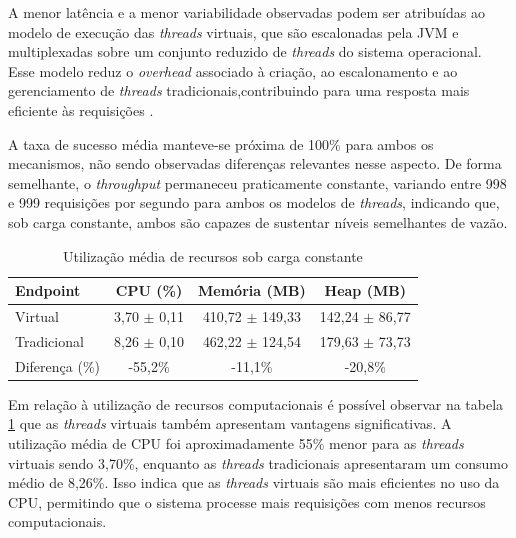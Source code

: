 \documentclass[12pt, openright, oneside, a4paper, english,	french,	spanish, brazil	]{abntex2}
\begin{document}
A menor latência e a menor variabilidade observadas podem ser atribuídas ao modelo de execução das \textit{threads} virtuais, que são escalonadas pela JVM e multiplexadas sobre um conjunto reduzido de \textit{threads} do sistema operacional. Esse modelo reduz o \textit{overhead} associado à criação, ao escalonamento e ao gerenciamento de \textit{threads} tradicionais,contribuindo para uma resposta mais eficiente às requisições \cite{JEP444}.

A taxa de sucesso média manteve-se próxima de 100\% para ambos os mecanismos, não sendo observadas diferenças relevantes nesse aspecto. De forma semelhante, o \textit{throughput} permaneceu praticamente constante, variando entre 998 e 999 requisições por segundo para ambos os modelos de \textit{threads}, indicando que, sob carga constante, ambos são capazes de sustentar níveis semelhantes de vazão.

    \begin{table}[H]
        \centering
        \caption{\footnotesize Utilização média de recursos sob carga constante}
        \label{tab:recursos_carga_constante}
        \footnotesize
        \renewcommand{\arraystretch}{1.15}
        \setlength{\tabcolsep}{6pt}
        \begin{tabular}{lccc}
            \toprule
            \textbf{Endpoint} & \textbf{CPU (\%)} & \textbf{Memória (MB)} & \textbf{Heap (MB)} \\
            \midrule
            Virtual       & 3,70 $\pm$ 0,11  & 410,72 $\pm$ 149,33 & 142,24 $\pm$ 86,77 \\
            Tradicional   & 8,26 $\pm$ 0,10  & 462,22 $\pm$ 124,54 & 179,63 $\pm$ 73,73 \\
            Diferença (\%)& -55,2\%           & -11,1\%              & -20,8\% \\
            \bottomrule
        \end{tabular}
    \end{table}


Em relação à utilização de recursos computacionais é possível observar na tabela \ref{tab:recursos_carga_constante} que as \textit{threads} virtuais também apresentam vantagens significativas. A utilização média de CPU foi aproximadamente 55\% menor para as \textit{threads} virtuais sendo 3,70\%, enquanto as \textit{threads} tradicionais apresentaram um consumo médio de 8,26\%. Isso indica que as \textit{threads} virtuais são mais eficientes no uso da CPU, permitindo que o sistema processe mais requisições com menos recursos computacionais. 
\end{document}
